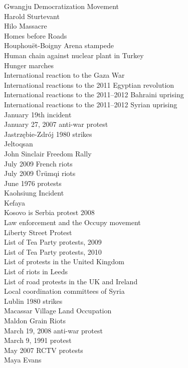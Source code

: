 Gwangju Democratization Movement\\
Harold Sturtevant\\
Hilo Massacre\\
Homes before Roads\\
Houphouët-Boigny Arena stampede\\
Human chain against nuclear plant in Turkey\\
Hunger marches\\
International reaction to the Gaza War\\
International reactions to the 2011 Egyptian revolution\\
International reactions to the 2011–2012 Bahraini uprising\\
International reactions to the 2011–2012 Syrian uprising\\
January 19th incident\\
January 27, 2007 anti-war protest\\
Jastrzębie-Zdrój 1980 strikes\\
Jeltoqsan\\
John Sinclair Freedom Rally\\
July 2009 French riots\\
July 2009 Ürümqi riots\\
June 1976 protests\\
Kaohsiung Incident\\
Kefaya\\
Kosovo is Serbia protest 2008\\
Law enforcement and the Occupy movement\\
Liberty Street Protest\\
List of Tea Party protests, 2009\\
List of Tea Party protests, 2010\\
List of protests in the United Kingdom\\
List of riots in Leeds\\
List of road protests in the UK and Ireland\\
Local coordination committees of Syria\\
Lublin 1980 strikes\\
Macassar Village Land Occupation\\
Maldon Grain Riots\\
March 19, 2008 anti-war protest\\
March 9, 1991 protest\\
May 2007 RCTV protests\\
Maya Evans\\
